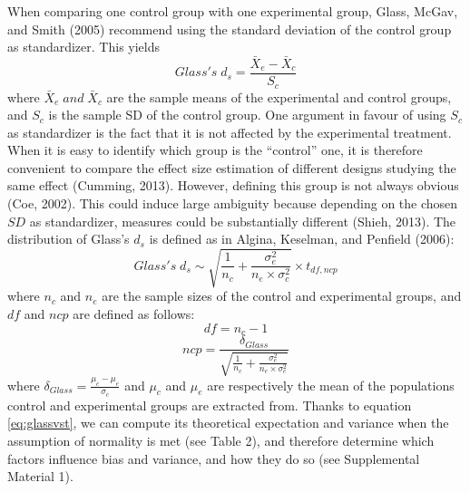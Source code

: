 \documentclass[
  english,
  man,floatsintext]{apa6}
\begin{document}
When comparing one control group with one experimental group, Glass, McGav, and Smith (2005) recommend using the standard deviation of the control group as standardizer. This yields
\begin{equation*} 
Glass's \; d_s = \frac{\bar{X}_{e} - \bar{X}_{c}}{S_{c}}
\label{eq:Glassds}
\end{equation*}
where \(\bar{X}_{e} \; and \; \bar{X}_{c}\) are the sample means of the experimental and control groups, and \(S_{c}\) is the sample SD of the control group. One argument in favour of using \(S_c\) as standardizer is the fact that it is not affected by the experimental treatment. When it is easy to identify which group is the ``control'' one, it is therefore convenient to compare the effect size estimation of different designs studying the same effect (Cumming, 2013). However, defining this group is not always obvious (Coe, 2002). This could induce large ambiguity because depending on the chosen \(SD\) as standardizer, measures could be substantially different (Shieh, 2013). The distribution of Glass's \(d_{s}\) is defined as in Algina, Keselman, and Penfield (2006):
\begin{equation} 
Glass's \; d_s \sim \sqrt{\frac{1}{n_{c}}+\frac{\sigma_{e}^2}{n_{e} \times \sigma^2_{c}}} \times t_{df,ncp}
\label{eq:glassvst}
\end{equation}
where \(n_c\) and \(n_e\) are the sample sizes of the control and experimental groups, and \(df\) and \(ncp\) are defined as follows:
\begin{equation} 
df = n_{c}-1
\label{eq:glassdf}
\end{equation}
\begin{equation*} 
ncp = \frac{\delta_{Glass}}{\sqrt{\frac{1}{n_{c}} + \frac{\sigma_{e}^2}{n_{e} \times \sigma^2_{c}}}}
\label{eq:glassncp}
\end{equation*}
where \(\delta_{Glass} = \frac{\mu_{c}-\mu_{e}}{\sigma_{c}}\) and \(\mu_c\) and \(\mu_e\) are respectively the mean of the populations control and experimental groups are extracted from. Thanks to equation \ref{eq:glassvst}, we can compute its theoretical expectation and variance when the assumption of normality is met (see Table 2), and therefore determine which factors influence bias and variance, and how they do so (see Supplemental Material 1).
\end{document}

